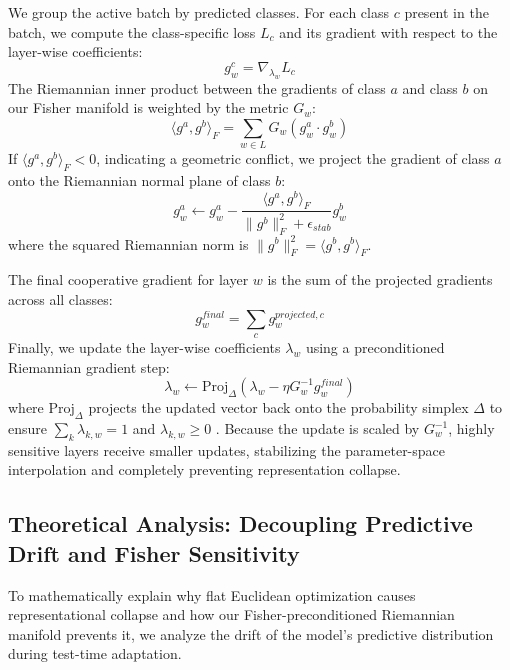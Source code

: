 \documentclass{article}
\theoremstyle{plain}
\theoremstyle{definition}
\theoremstyle{remark}
\begin{document}
We group the active batch by predicted classes. For each class $c$ present in the batch, we compute the class-specific loss $L_c$ and its gradient with respect to the layer-wise coefficients:
\begin{equation}
  g^c_w = \nabla_{\lambda_w} L_c
\end{equation}
The Riemannian inner product between the gradients of class $a$ and class $b$ on our Fisher manifold is weighted by the metric $G_w$:
\begin{equation}
  \langle g^a, g^b \rangle_F = \sum_{w \in L} G_w \left( g^a_w \cdot g^b_w \right)
\end{equation}
If $\langle g^a, g^b \rangle_F < 0$, indicating a geometric conflict, we project the gradient of class $a$ onto the Riemannian normal plane of class $b$:
\begin{equation}
  g^a_w \leftarrow g^a_w - \frac{\langle g^a, g^b \rangle_F}{\|g^b\|_F^2 + \epsilon_{stab}} g^b_w
\end{equation}
where the squared Riemannian norm is $\|g^b\|_F^2 = \langle g^b, g^b \rangle_F$.

The final cooperative gradient for layer $w$ is the sum of the projected gradients across all classes:
\begin{equation}
  g^{final}_w = \sum_{c} g^{projected, c}_w
\end{equation}
Finally, we update the layer-wise coefficients $\lambda_w$ using a preconditioned Riemannian gradient step:
\begin{equation}
  \lambda_w \leftarrow \text{Proj}_{\Delta} \left( \lambda_w - \eta G_w^{-1} g^{final}_w \right)
\end{equation}
where $\text{Proj}_{\Delta}$ projects the updated vector back onto the probability simplex $\Delta$ to ensure $\sum_k \lambda_{k,w} = 1$ and $\lambda_{k,w} \geq 0$ \cite{pascanu2013difficulty}. Because the update is scaled by $G_w^{-1}$, highly sensitive layers receive smaller updates, stabilizing the parameter-space interpolation and completely preventing representation collapse.

\subsection{Theoretical Analysis: Decoupling Predictive Drift and Fisher Sensitivity}
To mathematically explain why flat Euclidean optimization causes representational collapse and how our Fisher-preconditioned Riemannian manifold prevents it, we analyze the drift of the model's predictive distribution during test-time adaptation.
\end{document}
